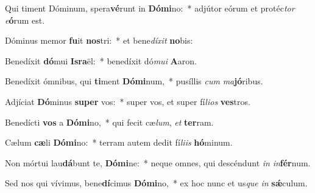 \item Qui timent Dóminum, spera\textbf{vé}runt in \textbf{Dó}\textbf{mi}no:~* adjútor eórum et protéc\textit{tor} \textit{e}\textbf{ó}rum est.
\item Dóminus memor \textbf{fu}it \textbf{nos}tri:~* et bene\textit{dí}\textit{xit} \textbf{no}bis:
\item Benedíxit \textbf{dó}mui \textbf{Is}\textbf{ra}ël:~* benedíxit dó\textit{mu}\textit{i} \textbf{A}aron.
\item Benedíxit ómnibus, qui \textbf{ti}ment \textbf{Dó}\textbf{mi}num,~* pusíllis \textit{cum} \textit{ma}\textbf{jó}ribus.
\item Adjíciat \textbf{Dó}minus \textbf{su}\textbf{per} vos:~* super vos, et super fí\textit{li}\textit{os} \textbf{ves}tros.
\item Benedícti \textbf{vos} a \textbf{Dó}\textbf{mi}no,~* qui fecit cæ\textit{lum}, \textit{et} \textbf{ter}ram.
\item Cælum \textbf{cæ}li \textbf{Dó}\textbf{mi}no:~* terram autem dedit fí\textit{li}\textit{is} \textbf{hó}minum.
\item Non mórtui lau\textbf{dá}bunt te, \textbf{Dó}\textbf{mi}ne:~* neque omnes, qui descéndunt \textit{in} \textit{in}\textbf{fér}num.
\item Sed nos qui vívimus, bene\textbf{dí}cimus \textbf{Dó}\textbf{mi}no,~* ex hoc nunc et us\textit{que} \textit{in} \textbf{sǽ}culum.
